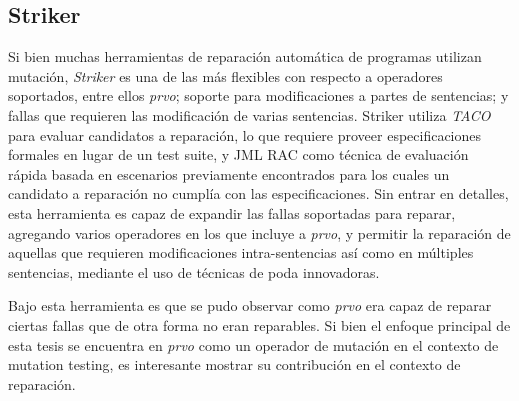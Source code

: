 \subsection{Striker}
\label{sec:repair.striker}

Si bien muchas herramientas de reparaci\'on autom\'atica de programas utilizan mutaci\'on, \emph{Striker} es una de las m\'as flexibles con respecto a operadores soportados, entre ellos \emph{prvo}; soporte para modificaciones a partes de sentencias; y fallas que requieren las modificaci\'on de varias sentencias. Striker utiliza \emph{TACO} \cite{bibliography.mutation.tools.TACOGaleottiRPF13} para evaluar candidatos a reparaci\'on, lo que requiere proveer especificaciones formales en lugar de un test suite, y JML RAC \cite{bibliography.misc.JMLRAC.LeavensCCRC02} como t\'ecnica de evaluaci\'on r\'apida basada en escenarios previamente encontrados para los cuales un candidato a reparaci\'on no cumpl\'ia con las especificaciones. Sin entrar en detalles, esta herramienta es capaz de expandir las fallas soportadas para reparar, agregando varios operadores en los que incluye a \emph{prvo}, y permitir la reparaci\'on de aquellas que requieren modificaciones intra-sentencias as\'i como en m\'ultiples sentencias, mediante el uso de t\'ecnicas de poda innovadoras.

Bajo esta herramienta es que se pudo observar como \emph{prvo} era capaz de reparar ciertas fallas que de otra forma no eran reparables. Si bien el enfoque principal de esta tesis se encuentra en \emph{prvo} como un operador de mutaci\'on en el contexto de mutation testing, es interesante mostrar su contribuci\'on en el contexto de reparaci\'on.